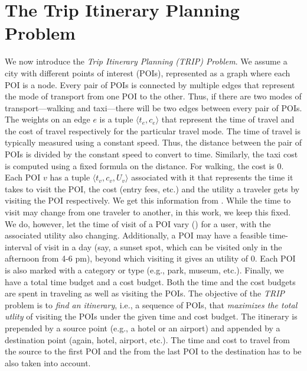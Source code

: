 \section{The Trip Itinerary Planning Problem}
\label{sec:problem}

We now introduce the \emph{Trip Itinerary Planning (TRIP) Problem}.
We assume a city with different points of interest (POIs),
represented as a graph where each POI is a node.  Every pair of POIs
is connected by multiple edges that represent the mode of transport
from one POI to the other.  Thus, if there are two modes of
transport---walking and taxi---there will be two edges between every
pair of POIs.  The weights on an edge $e$ is a tuple $\langle t_e,
c_e \rangle$ that represent the time of travel and the cost of travel
respectively for the particular travel mode.  The time of travel is
typically measured using a constant speed.  Thus, the distance
between the pair of POIs is divided by the constant speed to convert
to time.  Similarly, the taxi cost is computed using a fixed formula
on the distance.  For walking, the cost is $0$.  Each POI $v$ has a
tuple $\langle t_v, c_v, U_v \rangle$ associated with it that
represents the time it takes to visit the POI, the cost (entry fees,
etc.) and the utility a traveler gets by visiting the POI
respectively.  We get this information from .  While the
time to visit may change from one traveler to another, in this work,
we keep this fixed.  We do, however, let the time of visit of a POI
vary () for a user, with the associated
utility also changing.  Additionally, a POI may have a feasible
time-interval of visit in a day (say, a sunset spot, which can be
visited only in the afternoon from 4-6 pm), beyond which visiting it
gives an utility of $0$.  Each POI is also marked with a category or type (e.g.,
park, museum, etc.).  Finally, we have a total time budget and a cost
budget.  Both the time and the cost budgets are spent in traveling as
well as visiting the POIs.  The objective of the \emph{TRIP} problem
is to \emph{find an itinerary}, i.e., a sequence of POIs, that
\emph{maximizes the total utlity} of visiting the POIs under the
given time and cost budget.  The itinerary is prepended by a source
point (e.g., a hotel or an airport) and appended by a destination
point (again, hotel, airport, etc.).  The time and cost to travel
from the source to the first POI and the from the last POI to the
destination has to be also taken into account.

